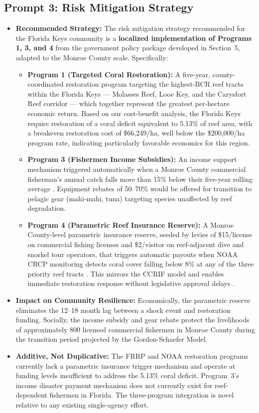 \documentclass[10pt,letterpaper]{article}
\begin{document}
\subsection*{Prompt 3: Risk Mitigation Strategy}
\begin{itemize}
    \item \textbf{Recommended Strategy:} The risk mitigation strategy recommended for the Florida Keys community is a \textbf{localized implementation of Programs 1, 3, and 4} from the government policy package developed in Section~5, adapted to the Monroe County scale. Specifically:
    \begin{itemize}
        \item \textbf{Program 1 (Targeted Coral Restoration):} A five-year, county-coordinated restoration program targeting the highest-BCR reef tracts within the Florida Keys --- Molasses Reef, Looe Key, and the Carysfort Reef corridor --- which together represent the greatest per-hectare economic return. Based on our cost-benefit analysis, the Florida Keys require restoration of a coral deficit equivalent to 5.13\% of reef area, with a breakeven restoration cost of \$66,249/ha, well below the \$200,000/ha program rate, indicating particularly favorable economics for this region.
        \item \textbf{Program 3 (Fishermen Income Subsidies):} An income support mechanism triggered automatically when a Monroe County commercial fisherman's annual catch falls more than 15\% below their five-year rolling average \cite{usda_disaster}. Equipment rebates of 50--70\% would be offered for transition to pelagic gear (mahi-mahi, tuna) targeting species unaffected by reef degradation.
        \item \textbf{Program 4 (Parametric Reef Insurance Reserve):} A Monroe County-level parametric insurance reserve, seeded by levies of \$15/license on commercial fishing licenses and \$2/visitor on reef-adjacent dive and snorkel tour operators, that triggers automatic payouts when NOAA CRCP monitoring detects coral cover falling below 8\% at any of the three priority reef tracts \cite{noaa_crcp}. This mirrors the CCRIF model and enables immediate restoration response without legislative approval delays \cite{ccrif_reef_insurance}.
    \end{itemize}
    \item \textbf{Impact on Community Resilience:} Economically, the parametric reserve eliminates the 12--18 month lag between a shock event and restoration funding. Socially, the income subsidy and gear rebate protect the livelihoods of approximately 800 licensed commercial fishermen in Monroe County during the transition period projected by the Gordon-Schaefer Model.
    \item \textbf{Additive, Not Duplicative:} The FRRP and NOAA restoration programs currently lack a parametric insurance trigger mechanism and operate at funding levels insufficient to address the 5.13\% coral deficit. Program~3's income disaster payment mechanism does not currently exist for reef-dependent fishermen in Florida. The three-program integration is novel relative to any existing single-agency effort.
\end{itemize}
\end{document}
